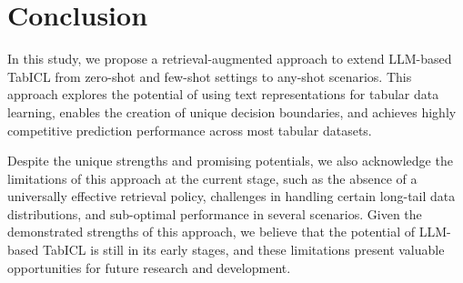 \section{Conclusion}
\label{sec:conclu}

In this study, we propose a retrieval-augmented approach to extend LLM-based TabICL from zero-shot and few-shot settings to any-shot scenarios.
This approach explores the potential of using text representations for tabular data learning, enables the creation of unique decision boundaries, and achieves highly competitive prediction performance across most tabular datasets.

Despite the unique strengths and promising potentials, we also acknowledge the limitations of this approach at the current stage, such as the absence of a universally effective retrieval policy, challenges in handling certain long-tail data distributions, and sub-optimal performance in several scenarios.
Given the demonstrated strengths of this approach, we believe that the potential of LLM-based TabICL is still in its early stages, and these limitations present valuable opportunities for future research and development.